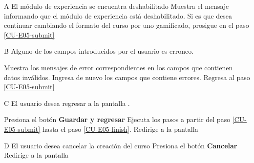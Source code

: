 \begin{UCtrayectoriaA}{A}{%
El módulo de experiencia se encuentra deshabilitado
}
  \Sistema Muestra el mensaje informando que el módulo de experiencia está deshabilitado.
  \Actor Si es que desea continuar cambiando el formato del curso por uno gamificado,
         prosigue en el paso \ref{CU-E05-submit}

\end{UCtrayectoriaA}

\begin{UCtrayectoriaA}{B}{%
Alguno de los campos introducidos por el usuario es erroneo.
}

  \Sistema Muestra los mensajes de error correspondientes en los campos que
           contienen datos inválidos.
  \Actor Ingresa de nuevo los campos que contiene errores.
  \Sistema Regresa al paso \ref{CU-E05-submit}

\end{UCtrayectoriaA}

\begin{UCtrayectoriaA}{C}{%
El usuario desea regresar a la pantalla .
}

  \Actor Presiona el botón {\bf Guardar y regresar}
  \Sistema Ejecuta los pasos a partir del paso \ref{CU-E05-submit} hasta el
           paso \ref{CU-E05-finish}.
  \Sistema Redirige a la pantalla 

\end{UCtrayectoriaA}

\begin{UCtrayectoriaA}{D}{%
El usuario desea cancelar la creación del curso
}
  \Actor Presiona el botón {\bf Cancelar}
  \Sistema Redirige a la pantalla 

\end{UCtrayectoriaA}
